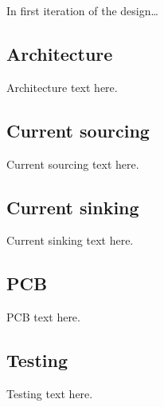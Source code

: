 \IEEEPARstart
{I}{n} first iteration of the design\dots

\subsection{Architecture}
Architecture text here.
\subsection{Current sourcing}
Current sourcing text here.
\subsection{Current sinking}
Current sinking text here.
\subsection{PCB}
PCB text here.
\subsection{Testing}
Testing text here.
